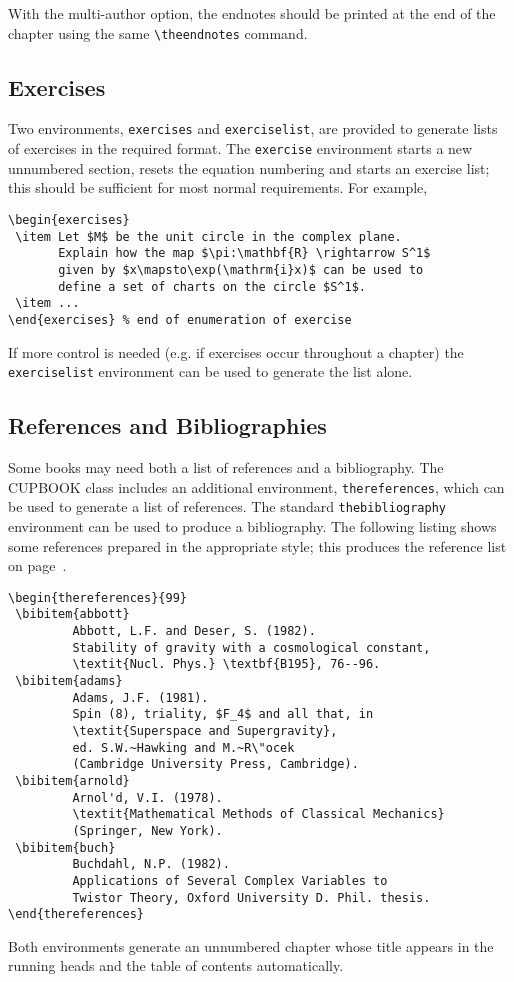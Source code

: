 \documentclass[cup6a]{cupbook}
\begin{document}
With the multi-author option, the endnotes should be printed at the end
of the chapter using the same \verb"\theendnotes" command.

\subsection{Exercises}

Two environments, \verb"exercises" and \verb"exerciselist", are provided to
generate lists of exercises in the required format.
 The \verb"exercise" environment starts a new unnumbered section, resets the
equation numbering and starts an exercise list; this should be sufficient for
most normal requirements. For example,
 \begin{verbatim}
\begin{exercises}
 \item Let $M$ be the unit circle in the complex plane.
       Explain how the map $\pi:\mathbf{R} \rightarrow S^1$
       given by $x\mapsto\exp(\mathrm{i}x)$ can be used to
       define a set of charts on the circle $S^1$.
 \item ...
\end{exercises} % end of enumeration of exercise
\end{verbatim}
 If more control is needed (e.g. if exercises occur throughout a chapter)
the \verb"exerciselist" environment can be used to generate the list alone.

\subsection{References and Bibliographies}

Some books may need both a list of references and a bibliography. The CUPBOOK
class includes an additional environment, \verb"thereferences", which can be
used to generate a list of references. The standard \verb"thebibliography"
environment can be used to produce a bibliography.
 The following listing shows some references prepared in the
appropriate style; this produces the reference list on page~\pageref{reflist}.
 \begin{verbatim}
\begin{thereferences}{99}
 \bibitem{abbott}
         Abbott, L.F. and Deser, S. (1982).
         Stability of gravity with a cosmological constant,
         \textit{Nucl. Phys.} \textbf{B195}, 76--96.
 \bibitem{adams}
         Adams, J.F. (1981).
         Spin (8), triality, $F_4$ and all that, in
         \textit{Superspace and Supergravity},
         ed. S.W.~Hawking and M.~R\"ocek
         (Cambridge University Press, Cambridge).
 \bibitem{arnold}
         Arnol'd, V.I. (1978).
         \textit{Mathematical Methods of Classical Mechanics}
         (Springer, New York).
 \bibitem{buch}
         Buchdahl, N.P. (1982).
         Applications of Several Complex Variables to
         Twistor Theory, Oxford University D. Phil. thesis.
\end{thereferences}
\end{verbatim}
 Both environments generate an unnumbered chapter whose
title appears in the running heads and the table of contents
automatically.
\end{document}
